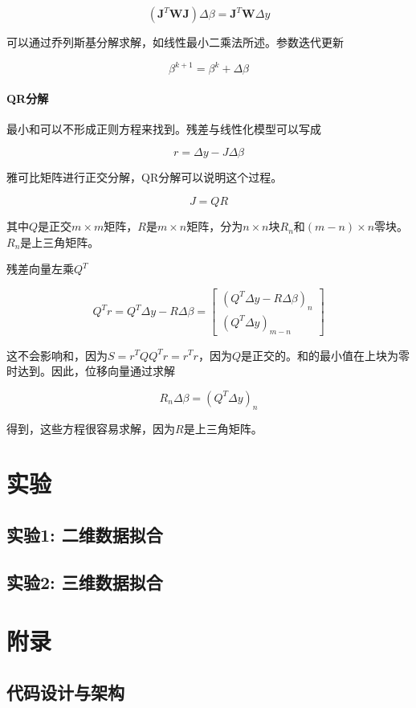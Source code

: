 \documentclass{ctexart}
\begin{document}
\[ (\mathbf{J}^T \mathbf{W} \mathbf{J}) \Delta \beta = \mathbf{J}^T \mathbf{W} \Delta y \]

可以通过乔列斯基分解求解，如线性最小二乘法所述。参数迭代更新

\[ \beta^{k+1} = \beta^k + \Delta \beta \]

\paragraph{QR分解}

最小和可以不形成正则方程来找到。残差与线性化模型可以写成

\[ r = \Delta y - J \Delta \beta \]

雅可比矩阵进行正交分解，QR分解可以说明这个过程。

\[ J = QR \]

其中$Q$是正交$m \times m$矩阵，$R$是$m \times n$矩阵，分为$n \times n$块$R_n$和$(m - n) \times n$零块。$R_n$是上三角矩阵。

残差向量左乘$Q^T$

\[ Q^T r = Q^T \Delta y - R \Delta \beta = \begin{bmatrix} (Q^T \Delta y - R \Delta \beta)_n \\ (Q^T \Delta y)_{m-n} \end{bmatrix} \]

这不会影响和，因为$S = r^T Q Q^T r = r^T r$，因为$Q$是正交的。和的最小值在上块为零时达到。因此，位移向量通过求解

\[ R_n \Delta \beta = (Q^T \Delta y)_n \]

得到，这些方程很容易求解，因为$R$是上三角矩阵。

\section{实验}

\subsection{实验1: 二维数据拟合}

\subsection{实验2: 三维数据拟合}

\section{附录}
\subsection{代码设计与架构}
\end{document}
